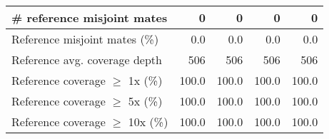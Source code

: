 \documentclass[12pt,a4paper]{article}
\begin{document}
\begin{table}[ht]
\begin{center}
\begin{tabular}{|l*{4}{|r}|}
\# reference misjoint mates & 0 & 0 & 0 & 0 \\ \hline
Reference misjoint mates (\%) & 0.0 & 0.0 & 0.0 & 0.0 \\ \hline
Reference avg. coverage depth & 506 & 506 & 506 & 506 \\ \hline
Reference coverage $\geq$ 1x (\%) & 100.0 & 100.0 & 100.0 & 100.0 \\ \hline
Reference coverage $\geq$ 5x (\%) & 100.0 & 100.0 & 100.0 & 100.0 \\ \hline
Reference coverage $\geq$ 10x (\%) & 100.0 & 100.0 & 100.0 & 100.0 \\ \hline
\end{tabular}
\end{center}
\end{table}
\end{document}
